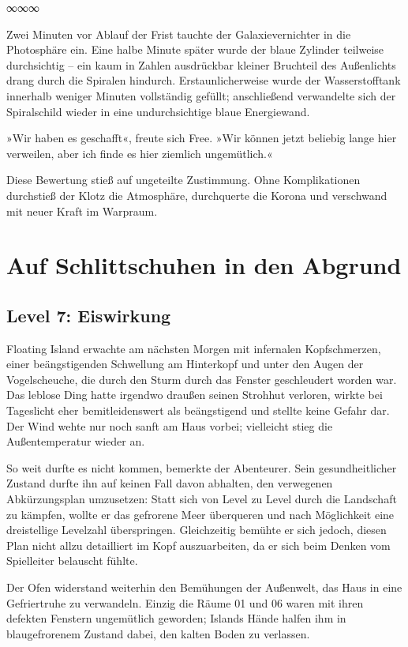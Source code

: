 \begin{center}
∞∞∞
\end{center}

Zwei Minuten vor Ablauf der Frist tauchte der Galaxievernichter in die Photosphäre ein. Eine halbe Minute später wurde der blaue Zylinder teilweise durchsichtig – ein kaum in Zahlen ausdrückbar kleiner Bruchteil des Außenlichts drang durch die Spiralen hindurch. Erstaunlicherweise wurde der Wasserstofftank innerhalb weniger Minuten vollständig gefüllt; anschließend verwandelte sich der Spiralschild wieder in eine undurchsichtige blaue Energiewand.

»Wir haben es geschafft«, freute sich Free. »Wir können jetzt beliebig lange hier verweilen, aber ich finde es hier ziemlich ungemütlich.«

Diese Bewertung stieß auf ungeteilte Zustimmung. Ohne Komplikationen durchstieß der Klotz die Atmosphäre, durchquerte die Korona und verschwand mit neuer Kraft im Warpraum.


\chapter{Auf Schlittschuhen in den Abgrund}

\section{Level 7: Eiswirkung}

Floating Island erwachte am nächsten Morgen mit infernalen Kopfschmerzen, einer beängstigenden Schwellung am Hinterkopf und unter den Augen der Vogelscheuche, die durch den Sturm durch das Fenster geschleudert worden war. Das leblose Ding hatte irgendwo draußen seinen Strohhut verloren, wirkte bei Tageslicht eher bemitleidenswert als beängstigend und stellte keine Gefahr dar. Der Wind wehte nur noch sanft am Haus vorbei; vielleicht stieg die Außentemperatur wieder an.

So weit durfte es nicht kommen, bemerkte der Abenteurer. Sein gesundheitlicher Zustand durfte ihn auf keinen Fall davon abhalten, den verwegenen Abkürzungsplan umzusetzen: Statt sich von Level zu Level durch die Landschaft zu kämpfen, wollte er das gefrorene Meer überqueren und nach Möglichkeit eine dreistellige Levelzahl überspringen. Gleichzeitig bemühte er sich jedoch, diesen Plan nicht allzu detailliert im Kopf auszuarbeiten, da er sich beim Denken vom Spielleiter belauscht fühlte.

Der Ofen widerstand weiterhin den Bemühungen der Außenwelt, das Haus in eine Gefriertruhe zu verwandeln. Einzig die Räume 01 und 06 waren mit ihren defekten Fenstern ungemütlich geworden; Islands Hände halfen ihm in blaugefrorenem Zustand dabei, den kalten Boden zu verlassen.

